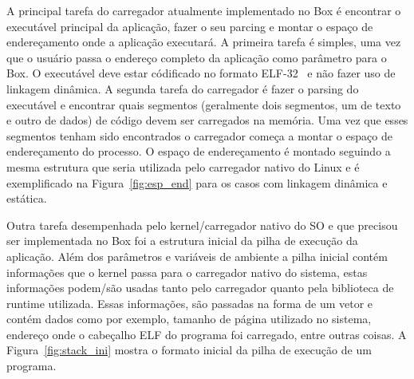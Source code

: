 \documentclass[11pt,twoside]{article}
\begin{document}
A principal tarefa do carregador atualmente implementado no Box é 
encontrar o executável principal da aplicação, fazer o seu parcing e
montar o espaço de endereçamento onde a aplicação executará. A primeira
tarefa é simples, uma vez que o usuário passa o endereço completo da
aplicação como parâmetro para o Box. O executável deve estar códificado
no formato ELF-32~\cite{SCO1997} e não fazer uso de linkagem dinâmica. A 
segunda tarefa do carregador é fazer o parsing do executável e encontrar
quais segmentos (geralmente dois segmentos, um de texto e outro de dados) 
de código devem ser carregados na memória. Uma vez que esses segmentos 
tenham sido encontrados o carregador começa a montar o espaço de 
endereçamento do processo. O espaço de endereçamento é montado seguindo
a mesma estrutura que seria utilizada pelo carregador nativo do Linux e
é exemplificado na Figura~\ref{fig:esp_end} para os casos com linkagem
dinâmica e estática.

Outra tarefa desempenhada pelo kernel/carregador nativo do SO e que
precisou ser implementada no Box foi a estrutura inicial da pilha de
execução da aplicação. Além dos parâmetros e variáveis de ambiente a
pilha inicial contém informações que o kernel passa para o carregador
nativo do sistema, estas informações podem/são usadas tanto pelo
carregador quanto pela biblioteca de runtime utilizada. Essas informações,
são passadas na forma de um vetor e contém dados como por exemplo, 
tamanho de página utilizado no sistema, endereço onde o cabeçalho ELF do 
programa foi carregado, entre outras coisas. A Figura~\ref{fig:stack_ini}
mostra o formato inicial da pilha de execução de um programa.
\end{document}
